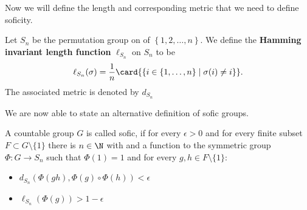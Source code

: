 	Now we will define the length and corresponding metric that we need to define soficity.

	\begin{definition}
		Let $S_n$ be the permutation group on of $\left\{ 1,2,\ldots,n \right\} $. 
		We define the \textbf{Hamming invariant length function} $\ell_{S_n}$ on $S_n$ to be \[
			\ell_{S_n}(\sigma) = \frac{1}{n} \card{\left\{ i \in \left\{ 1, \ldots, n \right\} \mid \sigma(i)\ne i \right\} }
		.\] 
		The associated metric is denoted by $d_{S_n}$
	\end{definition}
	We are now able to state an alternative definition of sofic groups.
	\begin{definition} %
		A countable group $G$ is called sofic, if for every $\epsilon > 0$ and for every finite subset  $F \subset G\setminus\{1\}$ there is $n \in \N$ with and a function to the symmetric group $\Phi: G \to S_n$ such that $\Phi(1) = 1$ and for every  $g, h \in F \setminus \{1\} $:
		\begin{itemize}
			\item $d_{S_n}\left( \Phi(gh), \Phi(g) \circ \Phi(h) \right) < \epsilon$
			\item $\ell_{S_n} \left( \Phi(g) \right) > 1-\epsilon$
		\end{itemize}
	\end{definition}

